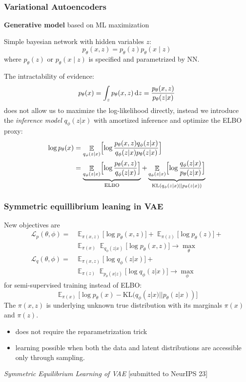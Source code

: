 \documentclass[aspectratio=169,11pt]{beamer}
\DeclareMathOperator{\EX}{\mathbb{E}}
\renewcommand{\d}[1]{\mbox{\rm d}#1}
\begin{document}
\begin{frame}
    \frametitle{Variational Autoencoders}
    \textbf{Generative model} based on ML maximization

    Simple bayesian network with hidden variables $z$:
    $$
    p_{\theta}(x,z) = p_{\theta}(z)p_{\theta}(x\mid z)
    $$
    where $p_{\theta}(z)$ or $p_{\theta}(x\mid z)$ is specified and parametrized by NN.

    The intractability of evidence:
    $$
    p_{\theta}(x) = \int_{z} p_{\theta}(x,z)\, \d z = \frac{p_{\theta}(x,z)}{p_{\theta}(z|x)}
    $$ 
    does not allow us to maximize the log-likelihood directly, instead we introduce the \textit{inference model} $q_{\phi}(z|x)$
    with amortized inference and optimize the ELBO proxy:
    \begin{align*}
        \log p_\theta(x) &= \EX_{q_{\phi}(z|x)} \Bigl[ \log \frac{p_\theta(x,z)q_\phi(z|x)}{q_\phi(z|x)p_\theta(z|x)} \Bigr] \\  
        &=\underbrace{\EX_{q_{\phi}(z|x)} \Bigl[ \log \frac{p_\theta(x,z)}{q_\phi(z|x)} \Bigr]}_{\mathrm{ELBO}} + 
        \underbrace{\EX_{q_{\phi}(z|x)} \Bigl[ \log \frac{q_\phi(z|x)}{p_{\theta}(z|x)} \Bigr]}_{\mathrm{KL}(q_{\phi}(z|x) || p_{\theta}(z|x))}
    \end{align*}
\end{frame}

\begin{frame}
    \frametitle{Symmetric equillibrium leaning in VAE}
    New objectives are 
    \begin{align*}
        \mathcal{L}_{p}(\theta,\phi) =& \EX_{\pi (x,z)}\bigl[\log p_{\theta}(x,z)\bigr]+
                        \EX_{\pi(z)}\bigl[\log p_{\theta}(z)\bigr] +\\
                        &\EX_{\pi(x)}\EX_{q_{\phi}(z|x)}\bigl[\log p_{\theta}(x,z)\bigr] \to \max_{\theta} \\
        \mathcal{L}_{q}(\theta,\phi) =& \EX_{\pi(x,z)}\bigl[\log q_{\phi}(z | x)\bigr] +\\ 
        &\EX_{\pi(z)}\EX_{p_{\theta}(x | z)} \bigl[\log q_{\phi}( z | x)\bigr] \to \max_{\phi}
    \end{align*}
    for semi-supervised training instead of ELBO:
    $$
    \EX_{\pi(x)} \bigl[ 
    \log p_{\theta}(x) - \mathrm{KL} (q_{\phi}(z | x) || p_{\theta}(z | x)) \bigr]
    $$
    The $\pi(x,z)$ is underlying unknown true distribution with its marginals $\pi(x)$ and $\pi(z)$.
    \begin{itemize}
    \item does not require the reparametrization trick 
    \item learning possible when both the data and latent distributions are accessible only through sampling.
    \end{itemize}
    \textit{Symmetric Equilibrium Learning of VAE} [submitted to NeurIPS 23]
\end{frame}
\end{document}
